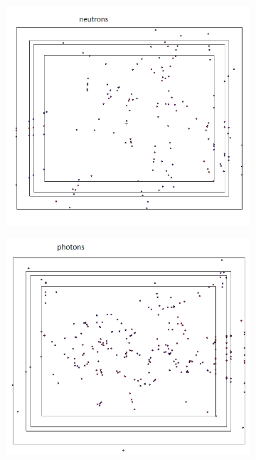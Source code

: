 \documentclass{mc2015}
\begin{document}
\begin{figure}[H]
        \centering
        \begin{subfigure}[b]{0.2\textwidth}
                \includegraphics[width=\textwidth]{figures/fig_mcnp_dist_n.png}
                \label{fig:mcnp_dist_n}
        \end{subfigure}
        \begin{subfigure}[b]{0.2\textwidth}
                \includegraphics[width=\textwidth]{figures/fig_mcnp_dist_ph.png}

\end{subfigure}
\end{figure}
\end{document}
